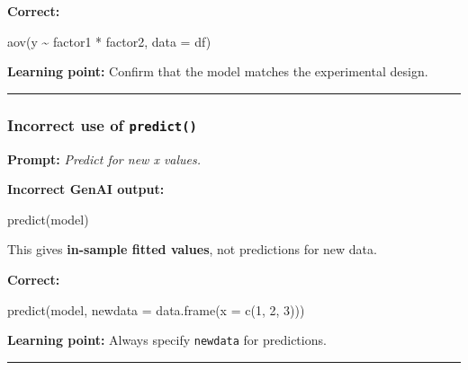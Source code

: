 \documentclass[
  letterpaper,
  8pt,
  a4paper]{book}
\newenvironment{Shaded}{\begin{snugshade}}{\end{snugshade}}
\newcommand{\AttributeTok}[1]{\textcolor[rgb]{0.40,0.45,0.13}{#1}}
\newcommand{\DecValTok}[1]{\textcolor[rgb]{0.68,0.00,0.00}{#1}}
\newcommand{\FunctionTok}[1]{\textcolor[rgb]{0.28,0.35,0.67}{#1}}
\newcommand{\NormalTok}[1]{\textcolor[rgb]{0.00,0.23,0.31}{#1}}
\newcommand{\SpecialCharTok}[1]{\textcolor[rgb]{0.37,0.37,0.37}{#1}}
\begin{document}
\textbf{Correct:}

\begin{Shaded}
\begin{Highlighting}[]
\FunctionTok{aov}\NormalTok{(y }\SpecialCharTok{\textasciitilde{}}\NormalTok{ factor1 }\SpecialCharTok{*}\NormalTok{ factor2, }\AttributeTok{data =}\NormalTok{ df)}
\end{Highlighting}
\end{Shaded}

\textbf{Learning point:} Confirm that the model matches the experimental
design.

\begin{center}\rule{0.5\linewidth}{0.5pt}\end{center}

\subsubsection*{\texorpdfstring{Incorrect use of
\texttt{predict()}}{Incorrect use of predict()}}\label{incorrect-use-of-predict}

\textbf{Prompt:} \emph{Predict for new x values.}

\textbf{Incorrect GenAI output:}

\begin{Shaded}
\begin{Highlighting}[]
\FunctionTok{predict}\NormalTok{(model)}
\end{Highlighting}
\end{Shaded}

This gives \textbf{in-sample fitted values}, not predictions for new
data.

\textbf{Correct:}

\begin{Shaded}
\begin{Highlighting}[]
\FunctionTok{predict}\NormalTok{(model, }\AttributeTok{newdata =} \FunctionTok{data.frame}\NormalTok{(}\AttributeTok{x =} \FunctionTok{c}\NormalTok{(}\DecValTok{1}\NormalTok{, }\DecValTok{2}\NormalTok{, }\DecValTok{3}\NormalTok{)))}
\end{Highlighting}
\end{Shaded}

\textbf{Learning point:} Always specify \texttt{newdata} for
predictions.

\begin{center}\rule{0.5\linewidth}{0.5pt}\end{center}
\end{document}

